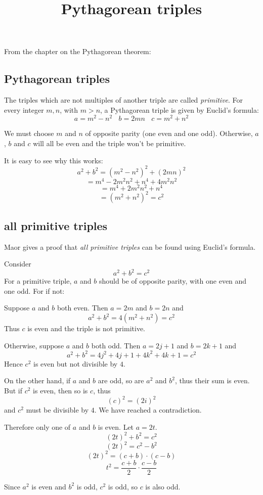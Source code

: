 \documentclass[11pt, oneside]{article}
\title{Pythagorean triples}
\date{}
\begin{document}
\maketitle
\Large

From the chapter on the Pythagorean theorem:
\subsection*{Pythagorean triples}
The triples which are not multiples of another triple are called \emph{primitive}.  For every integer $m,n$, with $m > n$, a Pythagorean triple is given by Euclid's formula:
\[ a = m^2 - n^2 \ \ \ \ b = 2mn \ \ \ \ c = m^2 + n^2 \]

We must choose $m$ and $n$ of opposite parity (one even and one odd).  Otherwise, $a$, $b$ and $c$ will all be even and the triple won't  be primitive.

It is easy to see why this works:
\[ a^2 + b^2 = (m^2 - n^2)^2 + (2mn)^2 \]
\[ = m^4 - 2m^2n^2 + n^4 + 4m^2n^2 \]
\[ = m^4 + 2m^2n^2 + n^4 \]
\[ = (m^2 + n^2)^2 = c^2 \]

\subsection*{all primitive triples}
Maor gives a proof that \emph{all primitive triples} can be found using Euclid's formula.

Consider 
\[ a^2 + b^2 = c^2 \]
For a primitive triple, $a$ and $b$ should be of opposite parity, with one even and one odd.  For if not:

Suppose $a$ and $b$ both even.  Then $a = 2m$ and $b = 2n$ and
\[ a^2 + b^2 = 4(m^2 + n^2) = c^2 \]
Thus $c$ is even and the triple is not primitive.

Otherwise, suppose $a$ and $b$ both odd.  Then $a = 2j +1$ and $b = 2k + 1$ and
\[ a^2 + b^2 = 4j^2 + 4j + 1 + 4k^2 + 4k + 1 = c^2 \]
Hence $c^2$ is even but not divisible by $4$.

On the other hand, if $a$ and $b$ are odd, so are $a^2$ and $b^2$, thus their sum is even.  But if $c^2$ is even, then so is $c$, thus 
\[ (c)^2 = (2i)^2 \]
and $c^2$ must be divisible by $4$.  We have reached a contradiction.  

Therefore only one of $a$ and $b$ is even.  Let $a = 2t$.
\[ (2t)^2 + b^2 = c^2 \]
\[ (2t)^2 = c^2 - b^2 \]
\[ (2t)^2 = (c + b) \cdot (c - b) \]
\[ t^2 = \frac{c+b}{2} \cdot \frac{c - b}{2} \]

Since $a^2$ is even and $b^2$ is odd, $c^2$ is odd, so $c$ is also odd.  
\end{document}
